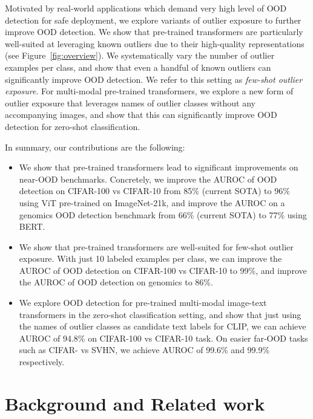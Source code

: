 \documentclass{article}
\begin{document}
Motivated by real-world applications which demand very high level of OOD detection for safe deployment, we explore variants of outlier exposure to further improve OOD detection.  
We show that pre-trained transformers are particularly well-suited at leveraging known outliers due to their high-quality representations (see Figure~\ref{fig:overview}). We systematically vary the number of outlier examples per class, and show that even a handful of known outliers can significantly improve OOD detection. We refer to this setting as \emph{few-shot outlier exposure}. 
For multi-modal pre-trained transformers, we explore a new form of outlier exposure that leverages names of outlier classes without any accompanying images, and show that this can significantly improve OOD detection for zero-shot classification. 









In summary, our contributions are the following:
\begin{itemize}[leftmargin=1em,itemsep=0em]
    \item We show that pre-trained transformers lead to significant improvements on  near-OOD benchmarks. Concretely, we improve the AUROC of OOD detection on CIFAR-100 vs CIFAR-10 from 85\% (current SOTA) to 96\% using ViT pre-trained on ImageNet-21k, and improve the AUROC on a genomics OOD detection benchmark from 66\% (current SOTA) to 77\% using BERT. 
\item  We show that pre-trained transformers are well-suited for few-shot outlier exposure. With just 10 labeled examples per class, we can  improve the AUROC of OOD detection on CIFAR-100 vs  CIFAR-10 to 99\%, and improve the AUROC of OOD detection on genomics to 86\%. 
\item We explore OOD detection for pre-trained multi-modal image-text transformers in the zero-shot classification setting, and show that just using the names of outlier classes as candidate text labels for CLIP, we can achieve AUROC of 94.8\% on CIFAR-100 vs CIFAR-10 task. On easier far-OOD tasks such as CIFAR- vs SVHN, we achieve AUROC of 99.6\% and 99.9\% respectively.
\end{itemize}






\section{Background and Related work}
\end{document}
